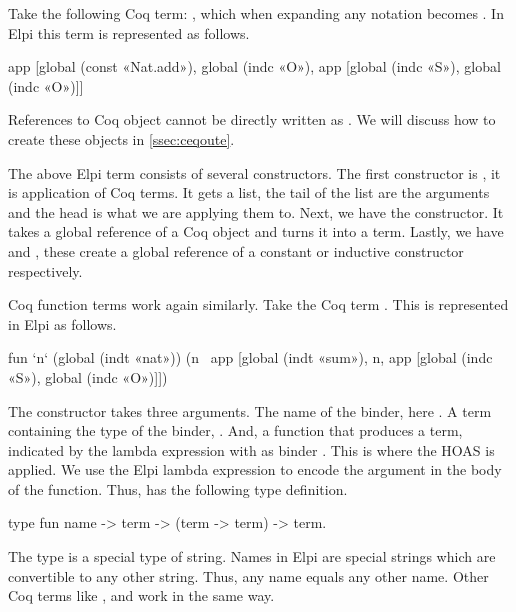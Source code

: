 \documentclass[thesis.tex]{subfiles}
\begin{document}
{{Take the following Coq term: , which when expanding any notation becomes . In Elpi this term is represented as follows.
\begin{elpicode}
  app [global (const «Nat.add»), 
      global (indc «O»), 
      app [global (indc «S»), global (indc «O»)]]
\end{elpicode}
References to Coq object cannot be directly written as . We will discuss how to create these objects in \cref{ssec:ceqoute}.

The above Elpi term consists of several constructors. The first constructor is , it is application of Coq terms. It gets a list, the tail of the list are the arguments and the head is what we are applying them to. Next, we have the  constructor. It takes a global reference of a Coq object and turns it into a term. Lastly, we have  and , these create a global reference of a constant or inductive constructor respectively.

Coq function terms work again similarly. Take the Coq term . This is represented in Elpi as follows.
\begin{elpicode}
  fun `n` (global (indt «nat»)) 
            (n \ app [global (indt «sum»), 
                      n, app [global (indc «S»), 
                              global (indc «O»)]])
\end{elpicode}
The  constructor takes three arguments. The name of the binder, here . A term containing the type of the binder, . And, a function that produces a term, indicated by the lambda expression with as binder . This is where the HOAS is applied. We use the Elpi lambda expression to encode the argument in the body of the function. Thus,  has the following type definition.
\begin{elpicode}
  type fun name -> term -> (term -> term) -> term.
\end{elpicode}
The type  is a special type of string. Names in Elpi are special strings which are convertible to any other string. Thus, any name equals any other name. Other Coq terms like ,  and  work in the same way.

}}
\end{document}
